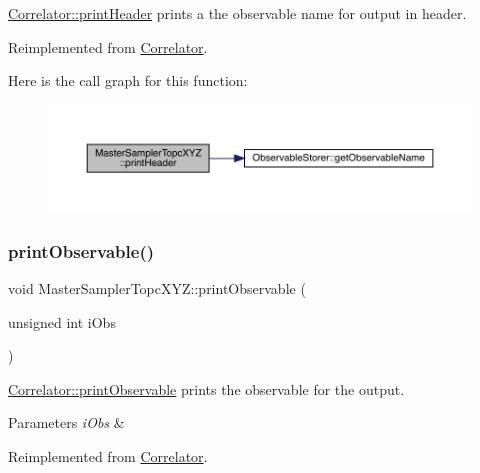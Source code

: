 \mbox{\hyperlink{class_correlator_ac7c5a07d7cbee97c417a1659b93083b2}{Correlator\+::print\+Header}} prints a the observable name for output in header. 



Reimplemented from \mbox{\hyperlink{class_correlator_ac7c5a07d7cbee97c417a1659b93083b2}{Correlator}}.

Here is the call graph for this function\+:\nopagebreak
\begin{figure}[H]
\begin{center}
\leavevmode
\includegraphics[width=350pt]{class_master_sampler_topc_x_y_z_a630a504ecbf3ceb517ebeefb39c3faff_cgraph}
\end{center}
\end{figure}
\mbox{\label{class_master_sampler_topc_x_y_z_ab2312c9e9dc1e9deeb5bce36784372ac}} 
\subsubsection{\texorpdfstring{printObservable()}{printObservable()}}
{\footnotesize\ttfamily void Master\+Sampler\+Topc\+X\+Y\+Z\+::print\+Observable (\begin{DoxyParamCaption}\item[{unsigned int}]{i\+Obs }\end{DoxyParamCaption})\hspace{0.3cm}{\ttfamily [virtual]}}



\mbox{\hyperlink{class_correlator_a15744ddb9f2b71fff34ac762d101df38}{Correlator\+::print\+Observable}} prints the observable for the output. 


\begin{DoxyParams}{Parameters}
{\em i\+Obs} & \\
\hline
\end{DoxyParams}


Reimplemented from \mbox{\hyperlink{class_correlator_a15744ddb9f2b71fff34ac762d101df38}{Correlator}}.

